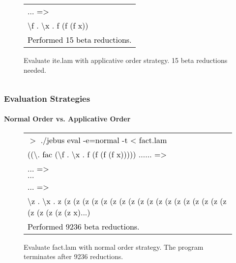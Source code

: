 \documentclass[xcolor=table]{beamer}
\begin{document}
\begin{frame}
\begin{block}
{\begin{columns}[T]
\begin{column}[T]{6cm}
\begin{figure}[h!]
\begin{footnotesize}
\begin{tabular}{l}
			      \textcolor{black}{$\ldots$ =>} \\
			      \textcolor{black}{\textbackslash f . \textbackslash x . f (f (f x))} \\
			      \textcolor{black}{Performed 15 beta reductions.} \\
			      \end{tabular}	
			  \end{footnotesize}			  
			  \caption{Evaluate ite.lam with applicative order strategy. 15 beta reductions needed.}
		 \end{figure}	          
     \end{column}
     \end{columns}
}

\end{block}
\end{frame}


\begin{frame}
\frametitle{Evaluation Strategies}
\framesubtitle{Normal Order vs. Applicative Order}
\begin{block}{
          \begin{figure}[h!]
				 \begin{footnotesize}
				 \begin{tabular}{l}
				 \textcolor{black}{
			      $>$ ./jebus eval -e=normal -t < fact.lam} \\
			      \textcolor{black}{((\textbackslash . fac (\textbackslash f . \textbackslash x . f (f (f (f x))))) $\ldots \ldots$ =>} \\ 
			      \textcolor{black}{$\ldots$ =>} \\
				  \textcolor{black}{$\ldots$} \\
			      \textcolor{black}{$\ldots$ =>} \\
			      \textcolor{black}{\textbackslash z . \textbackslash x . z (z (z (z (z (z (z (z (z (z (z (z (z (z (z (z (z (z (z (z (z (z (z (z x)...)} \\
			      \textcolor{black}{Performed 9236 beta reductions.} \\
			      \end{tabular}	
				 \end{footnotesize}
			  \caption{Evaluate fact.lam with normal order strategy. The program terminates after 9236 reductions.}
		 \end{figure}    
}

\end{block}
\end{frame}
\end{document}
